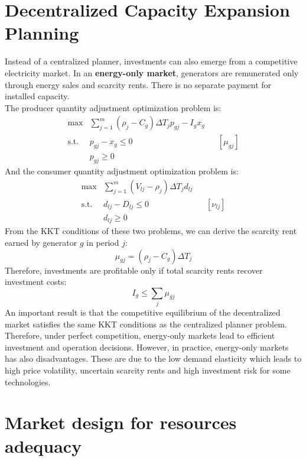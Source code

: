 \documentclass[12pt, openany]{report}
\theoremstyle{definition}
\begin{document}
\section{Decentralized Capacity Expansion Planning}
Instead of a centralized planner, investments can also emerge from a competitive electricity market. In an \textbf{energy-only market}, generators are remunerated only through energy sales and scarcity rents. There is no separate payment for installed capacity.\\
The producer quantity adjustment optimization problem is:
\begin{equation}
    \begin{aligned}
        \max &\sum_{j=1}^m (\rho_j - C_g) \Delta T_j p_{gj} - I_g x_g &&\\
        \text{s.t. } &p_{gj} - x_g \leq 0 && [\mu_{gj}] \\
        &p_{gj} \geq 0 &&
    \end{aligned}
\end{equation}
And the consumer quantity adjustment optimization problem is:
\begin{equation}
    \begin{aligned}
        \max &\sum_{j=1}^m (V_{lj} - \rho_j) \Delta T_j d_{lj} &&\\
        \text{s.t. } &d_{lj} - D_{lj} \leq 0 && [\nu_{lj}] \\
        &d_{lj} \geq 0 &&
    \end{aligned}
\end{equation}
From the KKT conditions of these two problems, we can derive the scarcity rent earned by generator $g$ in period $j$:
\begin{equation}
    \mu_{gj} = (\rho_j-C_g)\Delta T_j
\end{equation}
Therefore, investments are profitable only if total scarcity rents recover investment costs:
\begin{equation}
    I_g \leq \sum_j \mu_{gj}
\end{equation}
An important result is that the competitive equilibrium of the decentralized market satisfies the same KKT conditions as the centralized planner problem. Therefore, under perfect competition, energy-only markets lead to efficient investment and operation decisions. However, in practice, energy-only markets has also disadvantages. These are due to the low demand elasticity which leads to high price volatility, uncertain scarcity rents and high investment risk for some technologies.
\section{Market design for resources adequacy}
\end{document}
